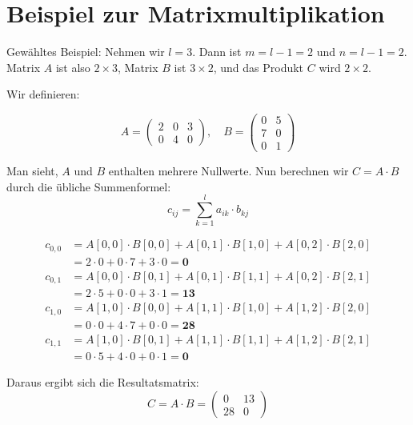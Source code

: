 \documentclass[a4paper,12pt]{article}
\begin{document}
\section*{Beispiel zur Matrixmultiplikation}

Gewähltes Beispiel: Nehmen wir \( l = 3 \). Dann ist \( m = l - 1 = 2 \) und \( n = l - 1 = 2 \). Matrix \( A \) ist also \( 2 \times 3 \), Matrix \( B \) ist \( 3 \times 2 \), und das Produkt \( C \) wird \( 2 \times 2 \).

Wir definieren:

\[
A = \begin{pmatrix}
2 & 0 & 3 \\
0 & 4 & 0
\end{pmatrix}, \quad
B = \begin{pmatrix}
0 & 5 \\
7 & 0 \\
0 & 1
\end{pmatrix}
\]

Man sieht, \( A \) und \( B \) enthalten mehrere Nullwerte. Nun berechnen wir \( C = A \cdot B \) durch die übliche Summenformel:
\[
c_{ij} = \sum_{k=1}^{l} a_{ik} \cdot b_{kj}
\]

\begin{align*}
c_{0,0} &= A[0,0] \cdot B[0,0] + A[0,1] \cdot B[1,0] + A[0,2] \cdot B[2,0] \\
        &= 2 \cdot 0 + 0 \cdot 7 + 3 \cdot 0 = \mathbf{0} \\[1em]
c_{0,1} &= A[0,0] \cdot B[0,1] + A[0,1] \cdot B[1,1] + A[0,2] \cdot B[2,1] \\
        &= 2 \cdot 5 + 0 \cdot 0 + 3 \cdot 1 = \mathbf{13} \\[1em]
c_{1,0} &= A[1,0] \cdot B[0,0] + A[1,1] \cdot B[1,0] + A[1,2] \cdot B[2,0] \\
        &= 0 \cdot 0 + 4 \cdot 7 + 0 \cdot 0 = \mathbf{28} \\[1em]
c_{1,1} &= A[1,0] \cdot B[0,1] + A[1,1] \cdot B[1,1] + A[1,2] \cdot B[2,1] \\
        &= 0 \cdot 5 + 4 \cdot 0 + 0 \cdot 1 = \mathbf{0}
\end{align*}

Daraus ergibt sich die Resultatsmatrix:
\[
C = A \cdot B =
\begin{pmatrix}
0 & 13 \\
28 & 0
\end{pmatrix}
\]
\end{document}
